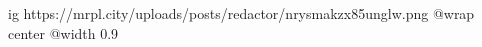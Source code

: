  
 
 
 
 

\ifcmt
  ig https://mrpl.city/uploads/posts/redactor/nrysmakzx85unglw.png
  @wrap center
  @width 0.9
\fi
